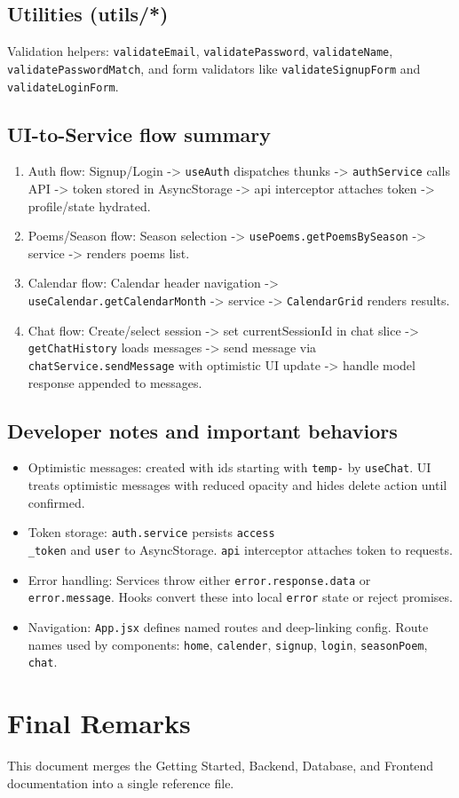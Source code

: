 \documentclass[11pt]{article}
\begin{document}
\subsection{Utilities (utils/*)}
Validation helpers: \texttt{validateEmail}, \texttt{validatePassword}, \texttt{validateName}, \texttt{validatePasswordMatch}, and form validators like \texttt{validateSignupForm} and \texttt{validateLoginForm}.

\subsection{UI-to-Service flow summary}
\begin{enumerate}
	\item Auth flow: Signup/Login -> \texttt{useAuth} dispatches thunks -> \texttt{authService} calls API -> token stored in AsyncStorage -> api interceptor attaches token -> profile/state hydrated.
	\item Poems/Season flow: Season selection -> \texttt{usePoems.getPoemsBySeason} -> service -> renders poems list.
	\item Calendar flow: Calendar header navigation -> \texttt{useCalendar.getCalendarMonth} -> service -> \texttt{CalendarGrid} renders results.
	\item Chat flow: Create/select session -> set currentSessionId in chat slice -> \texttt{getChatHistory} loads messages -> send message via \texttt{chatService.sendMessage} with optimistic UI update -> handle model response appended to messages.
\end{enumerate}

\subsection{Developer notes and important behaviors}
\begin{itemize}
	\item Optimistic messages: created with ids starting with \texttt{temp-} by \texttt{useChat}. UI treats optimistic messages with reduced opacity and hides delete action until confirmed.
	\item Token storage: \texttt{auth.service} persists \texttt{access\\_token} and \texttt{user} to AsyncStorage. \texttt{api} interceptor attaches token to requests.
	\item Error handling: Services throw either \texttt{error.response.data} or \texttt{error.message}. Hooks convert these into local \texttt{error} state or reject promises.
	\item Navigation: \texttt{App.jsx} defines named routes and deep-linking config. Route names used by components: \texttt{home}, \texttt{calender}, \texttt{signup}, \texttt{login}, \texttt{seasonPoem}, \texttt{chat}.
\end{itemize}

\section*{Final Remarks}
This document merges the Getting Started, Backend, Database, and Frontend documentation into a single reference file.

\vfill
{}
\end{document}
